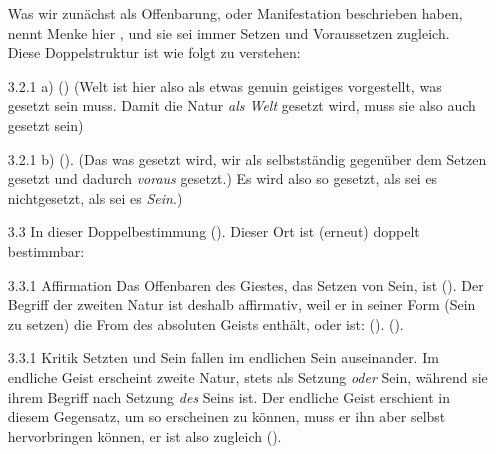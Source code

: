\documentclass[12pt, a4paper, openany]{report}
\begin{document}
\begin{itemize}
    Was wir zunächst als Offenbarung, oder Manifestation beschrieben haben, nennt Menke hier , und sie sei immer Setzen und Voraussetzen zugleich.\\
    Diese Doppelstruktur ist wie folgt zu verstehen:
    \item[3.2.1 a)]  (\cite[][142]{menke_autonomie_2018})
    (Welt ist hier also als etwas genuin geistiges vorgestellt, was gesetzt sein muss.
    Damit die Natur \emph{als Welt} gesetzt wird, muss sie also auch gesetzt sein) 
    \item[3.2.1 b)]  (\cite[][142]{menke_autonomie_2018}).
    (Das was gesetzt wird, wir als selbstständig gegenüber dem Setzen gesetzt und dadurch \emph{voraus} gesetzt.)
    Es wird also so gesetzt, als sei es nichtgesetzt, als sei es \emph{Sein}.)
    \item[3.3] In dieser Doppelbestimmung  (\cite[][142]{menke_autonomie_2018}).  
    Dieser Ort ist (erneut) doppelt bestimmbar:
    \item[3.3.1 Affirmation] Das Offenbaren des Giestes, das Setzen von Sein, ist  (\cite[][§384, S. 29]{hegel_enzyklopädie_1969}).
    Der Begriff der zweiten Natur ist deshalb affirmativ, weil er in seiner Form (Sein zu setzen) die From des absoluten Geists enthält, oder ist: 
     (\cite[][§ 385 Z, S. 34]{hegel_enzyklopädie_1969}).
     (\cite[][144]{menke_autonomie_2018}).
    \item[3.3.1 Kritik] Setzten und Sein fallen im endlichen Sein auseinander.
    Im endliche Geist erscheint zweite Natur, stets als Setzung \emph{oder} Sein, während sie ihrem Begriff nach Setzung \emph{des} Seins ist. 
    Der endliche Geist erschient in diesem Gegensatz, um so erscheinen zu können, muss er ihn aber selbst hervorbringen können, er ist also zugleich  (\cite[][144]{menke_autonomie_2018}).

\end{itemize}
\end{document}

